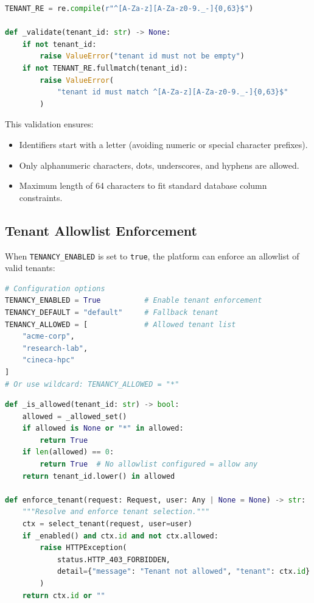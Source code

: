 \begin{lstlisting}[language=Python,caption={Tenant identifier validation}]
TENANT_RE = re.compile(r"^[A-Za-z][A-Za-z0-9._-]{0,63}$")

def _validate(tenant_id: str) -> None:
    if not tenant_id:
        raise ValueError("tenant id must not be empty")
    if not TENANT_RE.fullmatch(tenant_id):
        raise ValueError(
            "tenant id must match ^[A-Za-z][A-Za-z0-9._-]{0,63}$"
        )
\end{lstlisting}

This validation ensures:
\begin{itemize}
    \item Identifiers start with a letter (avoiding numeric or special character prefixes).
    \item Only alphanumeric characters, dots, underscores, and hyphens are allowed.
    \item Maximum length of 64 characters to fit standard database column constraints.
\end{itemize}

\subsection{Tenant Allowlist Enforcement}
\label{subsec:tenant-allowlist}

When \texttt{TENANCY\_ENABLED} is set to \texttt{true}, the platform can enforce an allowlist of valid tenants:

\begin{lstlisting}[language=Python,caption={Tenant allowlist configuration}]
# Configuration options
TENANCY_ENABLED = True          # Enable tenant enforcement
TENANCY_DEFAULT = "default"     # Fallback tenant
TENANCY_ALLOWED = [             # Allowed tenant list
    "acme-corp",
    "research-lab",
    "cineca-hpc"
]
# Or use wildcard: TENANCY_ALLOWED = "*"
\end{lstlisting}

\begin{lstlisting}[language=Python,caption={Allowlist enforcement logic}]
def _is_allowed(tenant_id: str) -> bool:
    allowed = _allowed_set()
    if allowed is None or "*" in allowed:
        return True
    if len(allowed) == 0:
        return True  # No allowlist configured = allow any
    return tenant_id.lower() in allowed

def enforce_tenant(request: Request, user: Any | None = None) -> str:
    """Resolve and enforce tenant selection."""
    ctx = select_tenant(request, user=user)
    if _enabled() and ctx.id and not ctx.allowed:
        raise HTTPException(
            status.HTTP_403_FORBIDDEN,
            detail={"message": "Tenant not allowed", "tenant": ctx.id}
        )
    return ctx.id or ""
\end{lstlisting}


